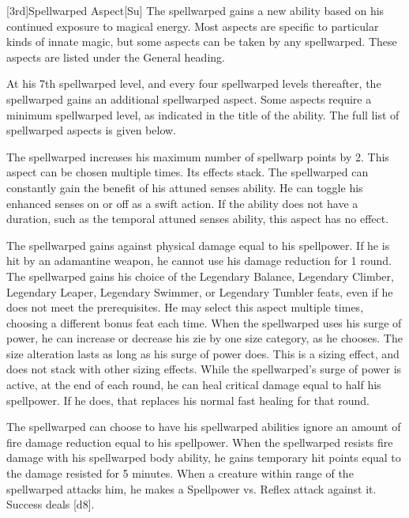 [3rd]{Spellwarped Aspect}[Su]
The spellwarped gains a new ability based on his continued exposure to magical energy.
Most aspects are specific to particular kinds of innate magic, but some aspects can be taken by any spellwarped.
These aspects are listed under the General heading.

At his 7th spellwarped level, and every four spellwarped levels thereafter, the spellwarped gains an additional spellwarped aspect.
Some aspects require a minimum spellwarped level, as indicated in the title of the ability.
The full list of spellwarped aspects is given below.

     The spellwarped increases his maximum number of spellwarp points by 2.
    This aspect can be chosen multiple times.
    Its effects stack.
    The spellwarped can constantly gain the benefit of his attuned senses ability.
    He can toggle his enhanced senses on or off as a swift action.
    If the ability does not have a duration, such as the temporal attuned senses ability, this aspect has no effect.

    The spellwarped gains  against physical damage equal to his spellpower.
    If he is hit by an adamantine weapon, he cannot use his damage reduction for 1 round.
    The spellwarped gains his choice of the Legendary Balance, Legendary Climber, Legendary Leaper, Legendary Swimmer, or Legendary Tumbler feats, even if he does not meet the prerequisites.
    He may select this aspect multiple times, choosing a different bonus feat each time.
    When the spellwarped uses his surge of power, he can increase or decrease his zie by one size category, as he chooses.
    The size alteration lasts as long as his surge of power does.
    This is a sizing effect, and does not stack with other sizing effects.
    While the spellwarped's surge of power is active, at the end of each round, he can heal critical damage equal to half his spellpower.
    If he does, that replaces his normal fast healing for that round.

    The spellwarped can choose to have his spellwarped abilities ignore an amount of fire damage reduction equal to his spellpower.
    When the spellwarped resists fire damage with his spellwarped body ability, he gains temporary hit points equal to the damage resisted for 5 minutes.
    When a creature within \rngclose range of the spellwarped attacks him, he makes a Spellpower vs. Reflex attack against it.
    Success deals [d8].

